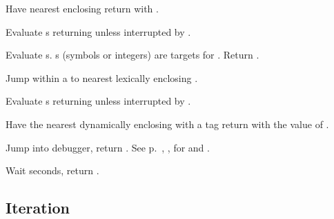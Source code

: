 \begin{LIST}{1cm}
   Have nearest enclosing
    return with .

   Evaluate s returning
   unless interrupted by .

   Evaluate
  s. s (symbols or integers) are targets for . Return \retval{\NIL}.

   Jump within a  to nearest
  lexically enclosing  .

    Evaluate s returning
   unless interrupted by .

   Have the nearest dynamically
  enclosing  with a tag   return with the
  value of .

  Jump into debugger, return \retval{\NIL}.
  See p.\ \pageref{section:Format}, , for  and .

   Wait  seconds, return \retval{\NIL}.

\end{LIST}



\subsection{Iteration}

